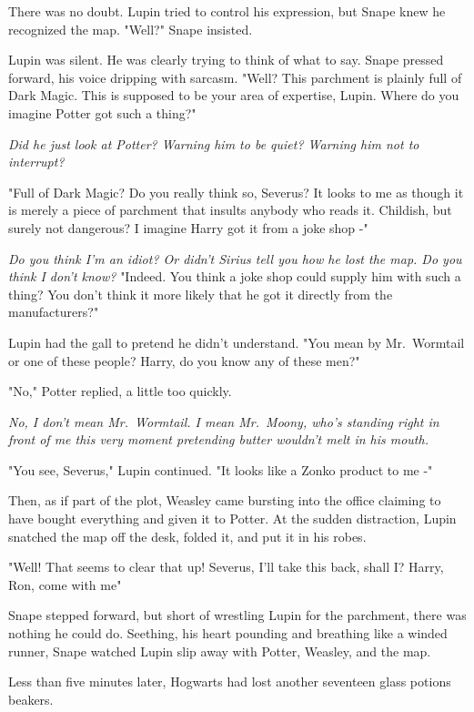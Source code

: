 There was no doubt. Lupin tried to control his expression, but Snape knew he recognized the map. "Well?" Snape insisted.

Lupin was silent. He was clearly trying to think of what to say. Snape pressed forward, his voice dripping with sarcasm. "Well? This parchment is plainly full of Dark Magic. This is supposed to be your area of expertise, Lupin. Where do you imagine Potter got such a thing?"

\emph{Did he just look at Potter? Warning him to be quiet? Warning him not to interrupt?}

"Full of Dark Magic? Do you really think so, Severus? It looks to me as though it is merely a piece of parchment that insults anybody who reads it. Childish, but surely not dangerous? I imagine Harry got it from a joke shop -"

\emph{Do you think I'm an idiot? Or didn't Sirius tell you how he lost the map. Do you think I don't know?} "Indeed. You think a joke shop could supply him with such a thing? You don't think it more likely that he got it directly from the manufacturers?"

Lupin had the gall to pretend he didn't understand. "You mean by Mr.~Wormtail or one of these people? Harry, do you know any of these men?"

"No," Potter replied, a little too quickly.

\emph{No, I don't mean Mr.~Wormtail. I mean Mr.~Moony, who's standing right in front of me this very moment pretending butter wouldn't melt in his mouth.}

"You see, Severus," Lupin continued. "It looks like a Zonko product to me -"

Then, as if part of the plot, Weasley came bursting into the office claiming to have bought everything and given it to Potter. At the sudden distraction, Lupin snatched the map off the desk, folded it, and put it in his robes.

"Well! That seems to clear that up! Severus, I'll take this back, shall I? Harry, Ron, come with me{\el}"

Snape stepped forward, but short of wrestling Lupin for the parchment, there was nothing he could do. Seething, his heart pounding and breathing like a winded runner, Snape watched Lupin slip away with Potter, Weasley, and the map.

Less than five minutes later, Hogwarts had lost another seventeen glass potions beakers.

\sbreak


